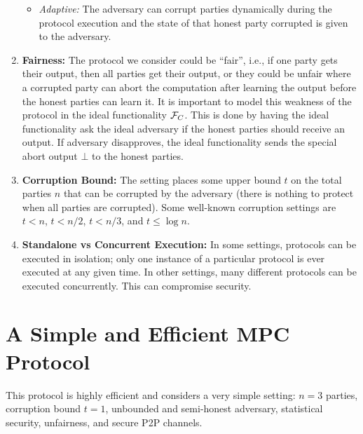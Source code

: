 \begin{enumerate}
\begin{itemize}
      \item \emph{Adaptive:} The adversary can corrupt parties dynamically during the protocol execution and the state of that honest party corrupted is given to the adversary. 
    \end{itemize}
  \item \textbf{Fairness:}
  The protocol we consider could be ``fair'', i.e., if one party gets their output, then all parties get their output, or they could be unfair where a corrupted party can abort the computation after learning the output before the honest parties can learn it.
  It is important to model this weakness of the protocol in the ideal functionality $\mathcal{F}_C$.
  This is done by having the ideal functionality ask the ideal adversary if the honest parties should receive an output. If adversary disapproves, the ideal functionality sends the special abort output $\bot$ to the honest parties.

  \item \textbf{Corruption Bound:} 
  The setting places some upper bound $t$ on the total parties $n$ that can be corrupted by the adversary (there is nothing to protect when all parties are corrupted). 
  Some well-known corruption settings are $t<n$, $t<n/2$, $t<n/3$, and $t \leq \log n$.

  \item \textbf{Standalone vs Concurrent Execution:}
  In some settings, protocols can be executed in isolation; only one instance of a particular protocol is ever executed at any given time. In other settings, many different protocols can be executed concurrently. This can compromise security.
\end{enumerate}

\section{A Simple and Efficient MPC Protocol}
This protocol is highly efficient and considers a very simple setting: $n=3$ parties, corruption bound $t=1$, unbounded and semi-honest adversary, statistical security, unfairness, and secure P2P channels.

